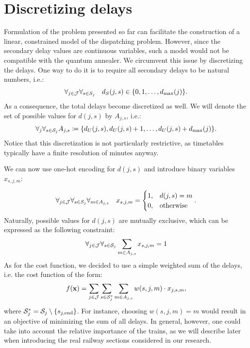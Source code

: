 \section{Discretizing delays}
Formulation of the problem presented so far can facilitate the construction of
a linear, constrained model of the dispatching problem. However, since the
secondary delay values are continuous variables, such a model would not be
compatible with the quantum annealer. We circumvent this issue by discretizing
the delays. One way to do it is to require all secondary delays to be natural
numbers, i.e.:
\begin{equation}
  \forall_{j \in \mathcal{J}} \forall_{s \in S_{j}}\quad  d_{S}(j, s) \in \{0, 1, \ldots, d_{\max}(j)\}.
\end{equation}
As a consequence, the total delays become discretized as well. We will denote
the set of possible values for $d(j, s)$ by $A_{j, s}$, i.e.:
    \begin{equation}
      \forall_{j}\forall_{s \in \mathcal{S}_j}  A_{j, s} \coloneq \{d_{U}(j, s), d_{U}(j, s) + 1, \ldots, d_{U}(j, s) + d_{\max}(j)\}.
    \end{equation}
    Notice that this discretization is not particularly restrictive, as timetables
    typically have a finite resolution of minutes anyway.

    We can now use one-hot encoding for $d(j, s)$ and introduce binary variables
  $x_{s, j, m}$:

    \begin{equation}
      \forall_{j \in \mathcal{J}}\forall_{s \in S_{j}} \forall_{m \in A_{j, s}} \quad x_{s,j,m} = \begin{cases}
        1, & d(j, s) = m      \\
        0, & \mbox{otherwise}
      \end{cases}.
    \end{equation}
    Naturally, possible values for $d(j, s)$ are mutually exclusive, which can be
    expressed as the following constraint:
    \begin{equation}
      \label{eq:onehotconstraint}
      \forall_{j \in \mathcal{J}}\forall_{s \in \mathcal{S}_j} \sum_{m \in A_{j, s}} x_{s, j, m} = 1
    \end{equation}
    As for the cost function, we decided to use a simple weighted sum of the
    delays, i.e. the cost function of the form:
    \begin{equation}
      \label{eq:qubo:cost}
      f(\mathbf{x}) = \sum_{j \in \mathcal{J}}\sum_{s \in \mathcal{S}_{j}^{*}} \sum_{m \in A_{j,s}} w(s,j,m) \cdot x_{j,s,m},
    \end{equation}
    where $\mathcal{S}_{j}^{*} = \mathcal{S}_j \setminus \{s_{j,\operatorname*{end}}\}$. For instance, choosing $w(s, j,
  m)=m$ would result in an objective of minimizing the sum of all delays. In
general, however, one could take into account the relative importance of the
trains, as we will describe later when introducing the real railway sections
considered in our research.


